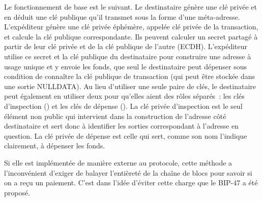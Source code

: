 Le fonctionnement de base est le suivant. Le destinataire génère une clé privée et en déduit une clé publique qu'il transmet sous la forme d'une méta-adresse. L'expéditeur génère une clé privée éphémère, appelée clé privée de la transaction, et calcule la clé publique correspondante. Ils peuvent calculer un secret partagé à partir de leur clé privée et de la clé publique de l'autre (ECDH). L'expéditeur utilise ce secret et la clé publique du destinataire pour construire une adresse à usage unique et y envoie les fonds, que seul le destinataire peut dépenser sous condition de connaître la clé publique de transaction (qui peut être stockée dans une sortie NULLDATA). Au lieu d'utiliser une seule paire de clés, le destinataire peut également en utiliser deux pour qu'elles aient des rôles séparés~: les clés d'inspection () et les clés de dépense (). La clé privée d'inspection est le seul élément non public qui intervient dans la construction de l'adresse côté destinataire et sert donc à identifier les sorties correspondant à l'adresse en question. La clé privée de dépense est celle qui sert, comme son nom l'indique clairement, à dépenser les fonds.

Si elle est implémentée de manière externe au protocole, cette méthode a l'inconvénient d'exiger de balayer l'entièreté de la chaîne de blocs pour savoir si on a reçu un paiement. C'est dans l'idée d'éviter cette charge que le BIP-47 a été proposé.


